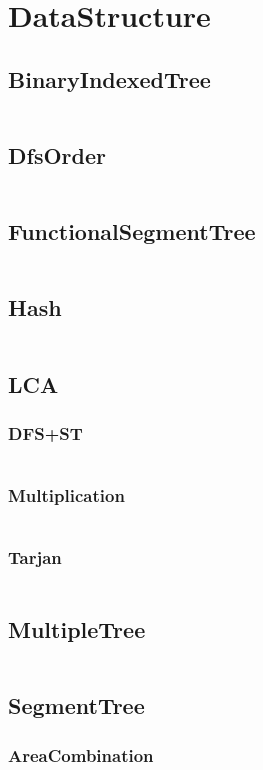 \documentclass[a4paper,11pt]{article}
\begin{document}
\newpage
\section{DataStructure}
\subsection{BinaryIndexedTree}
\inputminted[breaklines]{c++}{DataStructure/+BinaryIndexedTree.cpp}
\subsection{DfsOrder}
\inputminted[breaklines]{c++}{DataStructure/+DfsOrder.cpp}
\subsection{FunctionalSegmentTree}
\inputminted[breaklines]{c++}{DataStructure/+FunctionalSegmentTree.cpp}
\subsection{Hash}
\inputminted[breaklines]{c++}{DataStructure/+Hash.cpp}
\subsection{LCA}
\subsubsection{DFS+ST}
\inputminted[breaklines]{c++}{DataStructure/+LCA/+DFS+ST.cpp}
\subsubsection{Multiplication}
\inputminted[breaklines]{c++}{DataStructure/+LCA/+Multiplication.cpp}
\subsubsection{Tarjan}
\inputminted[breaklines]{c++}{DataStructure/+LCA/+Tarjan.cpp}

\subsection{MultipleTree}
\inputminted[breaklines]{c++}{DataStructure/+MultipleTree.cpp}
\subsection{SegmentTree}
\subsubsection{AreaCombination}
\inputminted[breaklines]{c++}{DataStructure/+SegmentTree/+AreaCombination.cpp}
\end{document}
